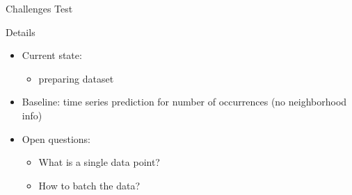 \documentclass[
  8pt,
  ignorenonframetext,
  aspectratio=43,
]{beamer}
\providecommand{\tightlist}{%
  \setlength{\itemsep}{0pt}\setlength{\parskip}{0pt}}
\begin{document}
\begin{frame}{Challenges}
\protect\hypertarget{challenges}{}
Test
\end{frame}

\begin{frame}{Details}
\protect\hypertarget{details}{}
\begin{itemize}
\tightlist
\item
  Current state:

  \begin{itemize}
  \tightlist
  \item
    preparing dataset
  \end{itemize}
\item
  Baseline: time series prediction for number of occurrences (no
  neighborhood info)
\item
  Open questions:

  \begin{itemize}
  \tightlist
  \item
    What is a single data point?
  \item
    How to batch the data?
  \end{itemize}
\end{itemize}
\end{frame}
\end{document}

